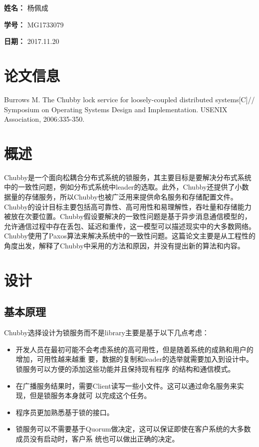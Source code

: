 \documentclass[UTF8]{article}
\begin{document}
    
{\flushleft \bf \Large 姓名：} 杨佩成

{\flushleft \bf \Large 学号：} MG1733079

{\flushleft \bf \Large 日期：} 2017.11.20


\section*{论文信息}
    
Burrows M. The Chubby lock service for loosely-coupled distributed systems[C]// Symposium on Operating Systems Design and Implementation. USENIX Association, 2006:335-350.


    
\section{概述}
	Chubby是一个面向松耦合分布式系统的锁服务，其主要目标是要解决分布式系统中的一致性问题，例如分布式系统中leader的选取。此外，Chubby还提供了小数据量的存储服务，所以Chubby也被广泛用来提供命名服务和存储配置文件。Chubby的设计目标主要包括高可靠性、高可用性和易理解性，吞吐量和存储能力被放在次要位置。Chubby假设要解决的一致性问题是基于异步消息通信模型的，允许通信过程中存在丢包、延迟和重传，这一模型可以描述现实中的大多数网络。Chubby使用了Paxos算法来解决系统中的一致性问题。这篇论文主要是从工程性的角度出发，解释了Chubby中采用的方法和原因，并没有提出新的算法和内容。
\section{设计}
	\subsection{基本原理}
	Chubby选择设计为锁服务而不是library主要是基于以下几点考虑：
\begin{itemize}
	\item
		开发人员在最初可能不会考虑系统的高可用性，但是随着系统的成熟和用户的增加，可用性越来越重		要，数据的复制和leader的选举就需要加入到设计中。锁服务可以方便的添加这些功能并且保持现有程序		的结构和通信模式。
	\item
		在广播服务结果时，需要Client读写一些小文件。这可以通过命名服务来实现，但是锁服务本身就可		以完成这个任务。
	\item
		程序员更加熟悉基于锁的接口。
	\item
		锁服务可以不需要基于Quorum做决定，这可以保证即使在客户系统的大多数成员没有启动时，客户系		统也可以做出正确的决定。
\end{itemize}
\end{document}
